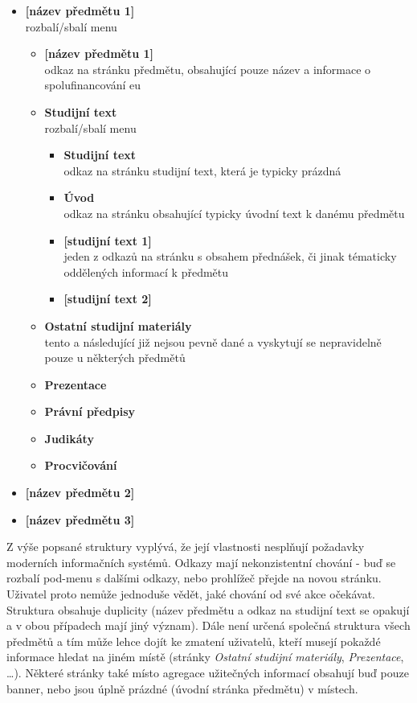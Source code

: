 \begin{itemize}
  \item \textbf{[název předmětu 1]} \hfill \\
    rozbalí/sbalí menu
  \begin{itemize}
    \item \textbf{[název předmětu 1]} \hfill \\
      odkaz na stránku předmětu, obsahující pouze název a informace o spolufinancování \gls{eu}
    \item \textbf{Studijní text} \hfill \\
      rozbalí/sbalí menu
      \begin{itemize}
        \item \textbf{Studijní text} \hfill \\
          odkaz na stránku studijní text, která je typicky prázdná
        \item \textbf{Úvod} \hfill \\
          odkaz na stránku obsahující typicky úvodní text k danému předmětu
        \item \textbf{[studijní text 1]} \hfill \\
          jeden z odkazů na stránku s obsahem přednášek, či jinak tématicky oddělených informací k předmětu
        \item \textbf{[studijní text 2]}
      \end{itemize}
    \item \textbf{Ostatní studijní materiály} \hfill \\
      tento a následující již nejsou pevně dané a vyskytují se nepravidelně pouze u některých předmětů
    \item \textbf{Prezentace}
    \item \textbf{Právní předpisy}            
    \item \textbf{Judikáty}
    \item \textbf{Procvičování}        
  \end{itemize}
  \item \textbf{[název předmětu 2]}
  \item \textbf{[název předmětu 3]}
\end{itemize}

Z výše popsané struktury vyplývá, že její vlastnosti nesplňují požadavky moderních informačních systémů. Odkazy mají nekonzistentní chování - buď se rozbalí pod-menu s dalšími odkazy, nebo prohlížeč přejde na novou stránku. Uživatel proto nemůže jednoduše vědět, jaké chování od své akce očekávat. Struktura obsahuje duplicity (název předmětu a odkaz na studijní text se opakují a v obou případech mají jiný význam). Dále není určená společná struktura všech předmětů a tím může lehce dojít ke zmatení uživatelů, kteří musejí pokaždé informace hledat na jiném místě (stránky \emph{Ostatní studijní materiály}, \emph{Prezentace}, \dots). Některé stránky také místo agregace užitečných informací obsahují buď pouze banner, nebo jsou úplně prázdné (úvodní stránka předmětu) v místech.

